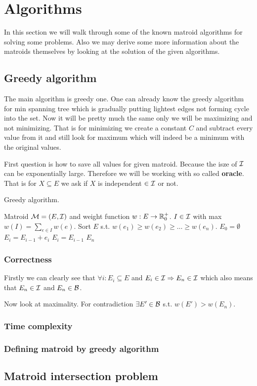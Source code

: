\chapter{Algorithms}

In this section we will walk through some of the known matroid algorithms for solving some problems. Also we may derive some more information about the matroids themselves by looking at the solution of the given algorithms.

\section{Greedy algorithm}

The main algorithm is greedy one. One can already know the greedy algorithm for min spanning tree which is gradually putting lightest edges not forming cycle into the set. Now it will be pretty much the same only we will be maximizing and not minimizing. That is for minimizing we create a constant $C$ and subtract every value from it and still look for maximum which will indeed be a minimum with the original values.

First question is how to save all values for given matroid. Because the isze of $\mathcal{I}$ can be exponentially large. Therefore we will be working with so called \textbf{oracle}. That is for $X \subseteq E$ we ask if $X$ is independent $\in \mathcal{I}$ or not.

\begin{algorithm}[!ht]
	\caption{Greedy algorithm.}
	\begin{algorithmic}[1]
		\Require Matroid $\mathcal{M} = (E, \mathcal{I})$ and weight function $w : E \to \mathbb{R}_0^+$.
		\Ensure $I \in \mathcal{I}$ with max $w(I) = \sum_{e \in I} w(e)$.
		\State Sort $E$ s.t. $w(e_1) \geq w(e_2) \geq \dots \geq w(e_n)$.
		\State $E_0 = \emptyset$
				\State $E_{i} = E_{i-1} + e_i$
			\Else
				\State $E_i = E_{i-1}$
			\EndIf
		\EndFor
		\State \Return $E_n$
	\end{algorithmic}
\end{algorithm}

\subsection{Correctness}

Firstly we can clearly see that $\forall i:  E_i \subseteq E$ and $E_i \in \mathcal{I} \Rightarrow E_n \in \mathcal{I}$ which also means that $E_n \in \mathcal{I}$ and $E_n \in \mathcal{B}$.

Now look at maximality. For contradiction $\exists E' \in \mathcal{B}$ s.t. $w(E') > w(E_n)$.

\subsection{Time complexity}

\subsection{Defining matroid by greedy algorithm}

\section{Matroid intersection problem}